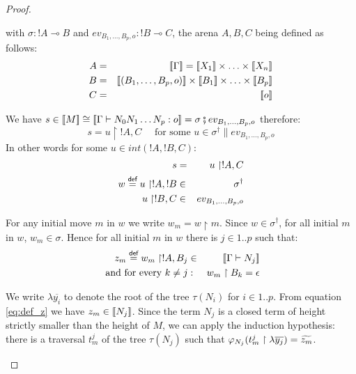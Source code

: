 \begin{proof}
\begin{itemize}
    with $\sigma : !A \multimap B$ and $ev_{B_1,\ldots,B_p,o} : !B \multimap C$, the arena $A,B,C$ being defined as follows:
    \begin{eqnarray*}
        A &=& \sem{\Gamma} = \sem{X_1} \times \ldots \times \sem{X_n}\\
        B &=& \sem{(B_1,\ldots,B_p,o)} \times \sem{B_1} \times \ldots \times \sem{B_p} \\
        C &=& \sem{o}
    \end{eqnarray*}




    We have $s \in {[\![M ]\!]} \cong {[\![\Gamma \vdash N_0 N_1 \ldots N_p : o ]\!]} = \sigma \fatsemi ev_{B_1,\ldots,B_p,o}$ therefore:
    \begin{equation}
        s = u \upharpoonright !A, C   \quad \mbox{ for some } u \in \sigma^{\dag} \parallel ev_{B_1,\ldots,B_p,o}
    \end{equation}
    In other words for some $u \in int(!A,!B,C)$:
    \begin{eqnarray}
        s &=& u \upharpoonright !A, C    \label{eq:def_s} \\
        w \stackrel{\textsf{def}}{=} u \upharpoonright !A,!B & \in& \sigma^\dagger       \label{eq:def_w}\\
        u \upharpoonright !B,C & \in & ev_{B_1,\ldots,B_p,o} \nonumber
    \end{eqnarray}

    For any initial move $m$ in $w$ we write $w_m = w \upharpoonright
    m$. Since $w \in \sigma^\dagger$, for all initial $m$ in $w$, $w_m \in \sigma$. Hence for
    all initial $m$ in $w$ there is $j \in 1..p$ such that:
    \begin{eqnarray}
        z_m \stackrel{\textsf{def}}{=} w_m \upharpoonright !A, B_j &\in& {[\![ \Gamma \vdash N_j ]\!]}  \label{eq:def_z} \\
        \mbox{ and for every } k\neq j &:& w_m \upharpoonright B_k = \epsilon \label{eq:b}
    \end{eqnarray}

    We write $\lambda \overline{y_i}$ to denote the root of the tree $\tau(N_i)$ for $i \in 1..p$.
    From equation \ref{eq:def_z} we have $z_m \in {[\![N_j ]\!]}$. Since the term $N_j$ is a closed term of height strictly smaller than the height
    of $M$, we can apply the induction hypothesis:
    there is a traversal $t^j_m$ of the tree $\tau(N_j)$
    such that $\varphi_{N_j}(t^j_m \upharpoonright \lambda \overline{y_j} ) = \widetilde{z_m}$.




\end{itemize}
\end{proof}
